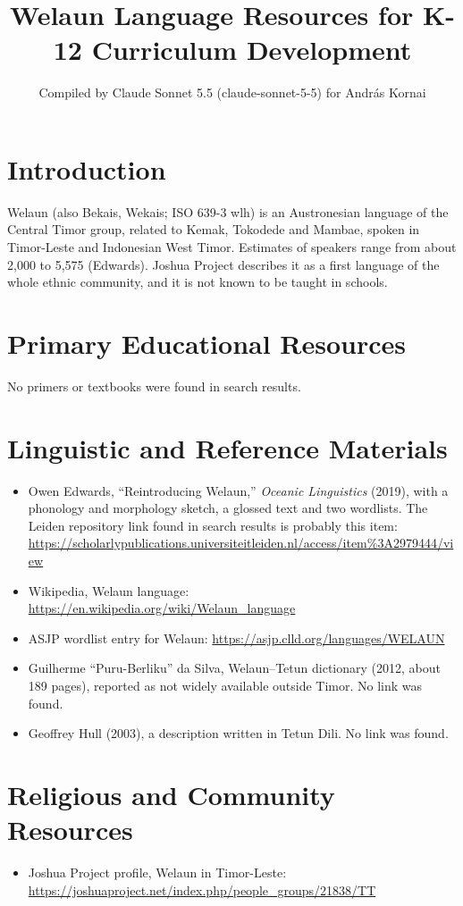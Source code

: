 \documentclass[12pt]{article}
\title{Welaun Language Resources for K-12 Curriculum Development}
\author{Compiled by Claude Sonnet 5.5 (claude-sonnet-5-5) for Andr\'as Kornai}
\date{}
\begin{document}
\maketitle

\section{Introduction}
Welaun (also Bekais, Wekais; ISO 639-3 wlh) is an Austronesian language of the Central Timor group, related to Kemak, Tokodede and Mambae, spoken in Timor-Leste and Indonesian West Timor. Estimates of speakers range from about 2,000 to 5,575 (Edwards). Joshua Project describes it as a first language of the whole ethnic community, and it is not known to be taught in schools.

\section{Primary Educational Resources}
No primers or textbooks were found in search results.

\section{Linguistic and Reference Materials}
\begin{itemize}
\item Owen Edwards, ``Reintroducing Welaun,'' \emph{Oceanic Linguistics} (2019), with a phonology and morphology sketch, a glossed text and two wordlists. The Leiden repository link found in search results is probably this item: \url{https://scholarlypublications.universiteitleiden.nl/access/item%3A2979444/view}
\item Wikipedia, Welaun language: \url{https://en.wikipedia.org/wiki/Welaun_language}
\item ASJP wordlist entry for Welaun: \url{https://asjp.clld.org/languages/WELAUN}
\item Guilherme ``Puru-Berliku'' da Silva, Welaun--Tetun dictionary (2012, about 189 pages), reported as not widely available outside Timor. No link was found.
\item Geoffrey Hull (2003), a description written in Tetun Dili. No link was found.
\end{itemize}

\section{Religious and Community Resources}
\begin{itemize}
\item Joshua Project profile, Welaun in Timor-Leste: \url{https://joshuaproject.net/index.php/people_groups/21838/TT}
\end{itemize}
\end{document}
